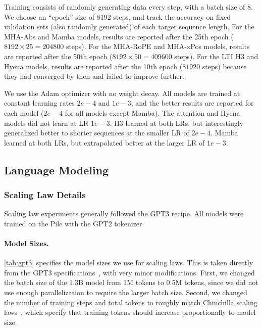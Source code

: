 Training consists of randomly generating data every step, with a batch size of $8$.
We choose an ``epoch'' size of 8192 steps, and track the accuracy on fixed validation sets (also randomly generated) of each target sequence length. %
For the MHA-Abs and Mamba models, results are reported after the 25th epoch ($8192 \times 25 = 204800$ steps).
For the MHA-RoPE and MHA-xPos models, results are reported after the 50th epoch ($8192 \times 50 = 409600$ steps).
For the LTI H3 and Hyena models, results are reported after the 10th epoch ($81920$ steps) because they had converged by then and failed to improve further.

We use the Adam optimizer with no weight decay.
All models are trained at constant learning rates $2e-4$ and $1e-3$,
and the better results are reported for each model ($2e-4$ for all models except Mamba).
The attention and Hyena models did not learn at LR $1e-3$.
H3 learned at both LRs, but interestingly generalized better to shorter sequences at the smaller LR of $2e-4$.
Mamba learned at both LRs, but extrapolated better at the larger LR of $1e-3$.


\subsection{Language Modeling}
\label{sec:exp-details:lm}


\subsubsection{Scaling Law Details}
\label{sec:exp-details:lm:scaling}

Scaling law experiments generally followed the GPT3 recipe.
All models were trained on the Pile with the GPT2 tokenizer.

\paragraph{Model Sizes.}

\cref{tab:gpt3} specifies the model sizes we use for scaling laws.
This is taken directly from the GPT3 specifications~\citep{brown2020language},
with very minor modifications.
First, we changed the batch size of the 1.3B model from 1M tokens to 0.5M tokens, since we did not use enough parallelization to require the larger batch size.
Second, we changed the number of training steps and total tokens to roughly match Chinchilla scaling laws~\citep{hoffmann2022empirical}, which specify that training tokens should increase proportionally to model size.

